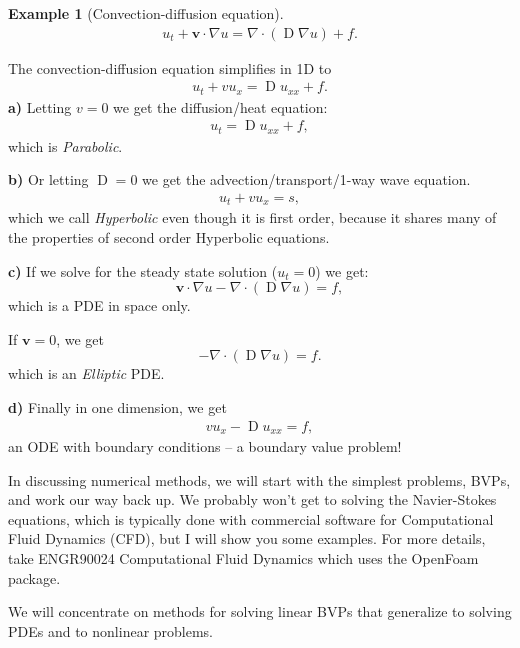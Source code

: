 \documentclass[12pt, a4paper]{article}
\renewcommand{\vec}[1]{\mathbf{#1}}
\theoremstyle{definition}
\newtheorem{example}[thm]{Example}
\theoremstyle{remark}
\numberwithin{equation}{section}
\begin{document}
\begin{example}[Convection-diffusion equation]
\begin{align*}
u_t+\vec{v}\cdot\nabla u=\nabla\cdot(\operatorname{D}\nabla u)+f.
\end{align*}

The convection-diffusion equation simplifies in 1D to
\begin{align*}
u_t+v u_x=\operatorname{D}u_{xx}+f.
\end{align*}
\textbf{a)} Letting $v=0$ we get the diffusion/heat equation:
\begin{align*}
u_t=\operatorname{D}u_{xx}+f,
\end{align*}
which is \emph{Parabolic}.

\textbf{b)} Or letting $\operatorname{D}=0$ we get the advection/transport/1-way wave equation.
\begin{align*}
u_t+vu_x=s,
\end{align*}
which we call \emph{Hyperbolic} even though it is first order, because it shares many of the properties of second order Hyperbolic equations.

\textbf{c)}  If we solve for the steady state solution ($u_t=0$) we get:
\begin{equation*}
\vec{v}\cdot\nabla u - \nabla \cdot(\operatorname{D}\nabla u)=f,
\end{equation*}
which is a PDE in space only. 

If $\vec{v}=0$, we get
\begin{equation*}
-\nabla\cdot(\operatorname{D}\nabla u)=f.
\end{equation*}
which is an \emph{Elliptic} PDE. 

\textbf{d)} Finally in one dimension, we get 
\begin{align*}
vu_x -\operatorname{D}u_{xx} =f,
\end{align*}
an ODE with boundary conditions -- a boundary value problem!
\end{example}

\newpage
In discussing numerical methods, we will start with the simplest problems, BVPs, and work our way back up. We probably won't get to 
solving the Navier-Stokes equations, which is typically done with commercial software for Computational Fluid Dynamics (CFD), but I will show you some examples. 
For more details, take ENGR90024 Computational Fluid Dynamics which uses the OpenFoam package. 

We will  concentrate on methods for solving linear BVPs that generalize to solving PDEs and to nonlinear problems.
\end{document}
